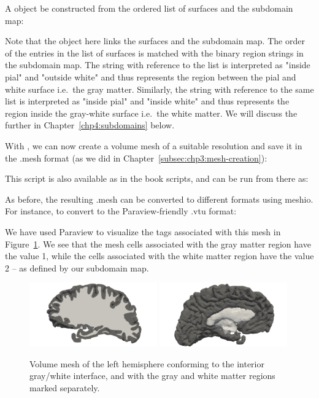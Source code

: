 A \svmtk{}  object be constructed from the
ordered list of surfaces and the subdomain map:


\noindent Note that the  object here links the
surfaces and the subdomain map. The order of the entries in the list
of surfaces is matched with the binary region strings in the subdomain
map. The string  with reference to the list
 is interpreted as "inside pial" and
"outside white" and thus represents the region between the pial and
white surface i.e.~the gray matter. Similarly, the string
 with reference to the same list is interpreted as
"inside pial" and "inside white" and thus represents the region inside
the gray-white surface i.e.~the white matter. We will discuss the
 further in Chapter~\ref{chp4:subdomains}
below.

With , we can now create a volume mesh of
a suitable resolution and save it in the .mesh format (as we did in
Chapter~\ref{subsec:chp3:mesh-creation}):

This script is also available as  in the
book scripts, and can be run from there as:

\noindent As before, the resulting .mesh can be converted to different formats
using meshio. For instance, to convert to the Paraview-friendly .vtu format: 

We have used Paraview to visualize the tags associated with this mesh
in Figure~\ref{fig:chp4:ernie-tagged-twodomain-mesh}. We see that the
mesh cells associated with the gray matter region have the value 1,
while the cells associated with the white matter region have the value
2 -- as defined by our subdomain map.

\begin{figure}
  \includegraphics[width=0.49\textwidth]{./chapters/chp4/FIG/two-domain-tagged-a.png}
  \includegraphics[width=0.49\textwidth]{./chapters/chp4/FIG/two-domain-tagged-b.png}
  \caption{Volume mesh of the left hemisphere conforming to the
    interior gray/white interface, and with the gray and white matter
    regions marked separately.}
  \label{fig:chp4:ernie-tagged-twodomain-mesh}
\end{figure}

